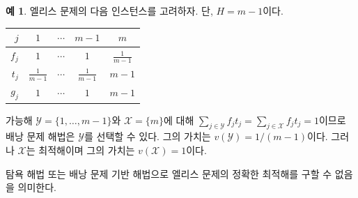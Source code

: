 \documentclass[11pt]{article} %
\newif\ifen
\theoremstyle{definition}
\newtheorem{example}{Example}
\theoremstyle{definition}
\newtheorem{example}{예}
\begin{document}
\fi
\begin{example} \label{knapsackheuristicellis}
\ifen Consider the following instance of Ellis's problem, where $H = m-1$.
\else 엘리스 문제의 다음 인스턴스를 고려하자. 단, $H = m-1$이다. \fi
\begin{center}
\begin{tabular}{r|cccc}
$j$   & $1$            & $\cdots$ & $m-1$          & $m$            \\ \hline
$f_j$ & $1$            &  $\cdots$ & $1$            & $\frac{1}{m-1}$ \\
$t_j$ & $\frac{1}{m-1}$ &  $\cdots$ & $\frac{1}{m-1}$ & $m-1$          \\
$g_j$ & $1$            &  $\cdots$ & $1$            & $m-1$         
\end{tabular}%
\end{center}
\ifen
The feasible solutions $\mathcal{Y} = \{1, \dots, m-1\}$ and $\mathcal{X} = \{ m\}$ each have $\sum_{j \in \mathcal{Y}} f_j t_j = \sum_{j \in \mathcal{X}} f_j t_j =  1$, and thus the knapsack algorithm can choose $\mathcal{Y}$ with $v(\mathcal{Y}) = 1/(m-1)$. But the optimal solution is  $\mathcal{X}$ with $v(\mathcal{X}) =  1$. 
\else
가능해 $\mathcal{Y} = \{1, \dots, m-1\}$와 $\mathcal{X} = \{ m\}$에 대해 $\sum_{j \in \mathcal{Y}} f_j t_j = \sum_{j \in \mathcal{X}} f_j t_j =  1$이므로 배낭 문제 해법은  $\mathcal{Y}$를 선택할 수 있다. 그의 가치는 $v(\mathcal{Y}) = 1/(m-1)$이다. 그러나 $\mathcal{X}$는 최적해이며 그의 가치는 $v(\mathcal{X}) =  1$이다.
\fi
\end{example}

\ifen 
In summary, neither a greedy algorithm nor a knapsack-based algorithm solves Ellis's problem to optimality. 
\else
탐욕 해법 또는 배낭 문제 기반 해법으로 엘리스 문제의 정확한 최적해를 구할 수 없음을 의미한다.
\fi
\end{document}
